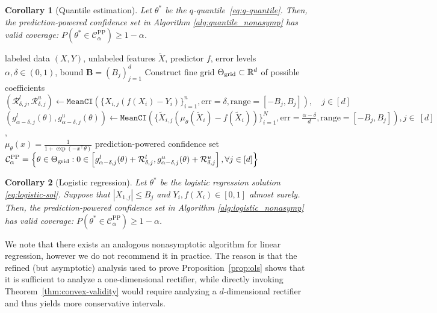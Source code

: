 \documentclass[10pt]{article}
\newtheorem{cor}{Corollary} %
\newcommand{\cR}{\mathcal{R}}
\newcommand{\Xa}{X}
\newcommand{\Xt}{\widetilde{X}}
\newcommand{\Ya}{Y}
\newcommand{\CPP}{\mathcal{C}^{\mathrm{PP}}}
\begin{document}
\begin{cor}[Quantile estimation]
\label{cor:quantile_cor}
    Let $\theta^*$ be the $q$-quantile~\eqref{eq:q-quantile}. Then, the prediction-powered confidence set in Algorithm \ref{alg:quantile_nonasymp} has valid coverage: $P(\theta^* \in \CPP_\alpha)\geq 1-\alpha$.
\end{cor}





\begin{algorithm}[H]
\caption{Prediction-powered logistic regression (nonasymptotic)}
\label{alg:logistic_nonasymp}
\begin{algorithmic}[1]
\Require labeled data $(\Xa, \Ya)$, unlabeled features $\Xt$, predictor $f$, error levels $\alpha,\delta \in(0,1)$, bound $\mathbf{B} = (B_j)_{j=1}^d$ 
\State Construct fine grid $\Theta_{\rm grid} \subset \mathbb{R}^d$ of possible coefficients
\State $(\cR_{\delta,j}^l, \cR_{\delta,j}^u) \leftarrow \texttt{MeanCI}\left( \{X_{i,j}(f(X_i) - Y_i)\}_{i=1}^n, \mathrm{err} = \delta, \mathrm{range} = [-B_j,B_j] \right), \quad j\in[d]$ 
\State $( g_{\alpha-\delta,j}^l(\theta), g_{\alpha-\delta,j}^u(\theta) ) \leftarrow \texttt{MeanCI}\left(\{\Xt_{i,j}\left(\mu_\theta(\Xt_i) - f(\Xt_i)\right)\}_{i=1}^N, \mathrm{err} = \frac{\alpha - \delta}{d}, \mathrm{range} = [-B_j,B_j] \right), j\in~[d]$,\\
\quad {} $\mu_\theta(x) = \frac{1}{1+\exp(-x^\top \theta)}$
\EndFor
\Ensure 
prediction-powered confidence set $\CPP_\alpha = \left\{\theta\in \Theta_{\rm grid}:  0 \in \left[g_{\alpha-\delta,j}^l(\theta) + \cR_{\delta,j}^l, g_{\alpha-\delta,j}^u(\theta) + \cR_{\delta,j}^u \right], \forall j\in[d] \right\}$
\end{algorithmic}
\end{algorithm}

\begin{cor}[Logistic regression]
\label{cor:logistic_valid}
Let $\theta^*$ be the logistic regression solution \eqref{eq:logistic-sol}. Suppose that $|X_{1,j}|\leq B_j$ and $Y_i,f(X_i)\in[0,1]$ almost surely. Then, the prediction-powered confidence set in Algorithm \ref{alg:logistic_nonasymp} has valid coverage: $P(\theta^* \in \CPP_\alpha)\geq 1-\alpha$.
\end{cor}

We note that there exists an analogous nonasymptotic algorithm for linear regression, however we do not recommend it in practice. The reason is that the refined (but asymptotic) analysis used to prove Proposition~\ref{prop:ols} shows that it is sufficient to analyze a one-dimensional rectifier, while directly invoking Theorem~\ref{thm:convex-validity} would require analyzing a $d$-dimensional rectifier and thus yields more conservative intervals.
\end{document}
